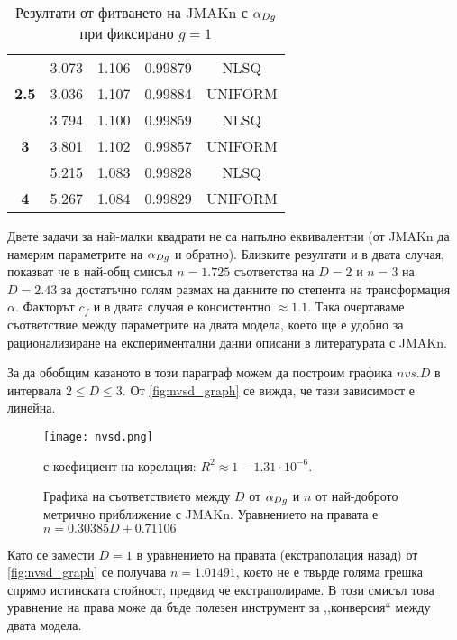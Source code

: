 \begin{table}[hbtp]
{\begin{tabular}{@{}ccccc@{}}
                                 & 3.073                         & 1.106                          & 0.99879                            & NLSQ                            \\
\multirow{-2}{*}{\textbf{2.5}}   & \cellcolor[HTML]{EFEFEF}3.036 & \cellcolor[HTML]{EFEFEF}1.107  & \cellcolor[HTML]{EFEFEF}0.99884    & \cellcolor[HTML]{EFEFEF}UNIFORM \\ \midrule
                                 & 3.794                         & 1.100                          & 0.99859                            & NLSQ                            \\
\multirow{-2}{*}{\textbf{3}}     & \cellcolor[HTML]{EFEFEF}3.801 & \cellcolor[HTML]{EFEFEF}1.102  & \cellcolor[HTML]{EFEFEF}0.99857    & \cellcolor[HTML]{EFEFEF}UNIFORM \\
                                 & 5.215                         & 1.083                          & 0.99828                            & NLSQ                            \\
\multirow{-2}{*}{\textbf{4}}     & \cellcolor[HTML]{EFEFEF}5.267 & \cellcolor[HTML]{EFEFEF}1.084  & \cellcolor[HTML]{EFEFEF}0.99829    & \cellcolor[HTML]{EFEFEF}UNIFORM \\ \bottomrule
\end{tabular}%
}
\caption{Резултати от фитването на JMAKn с $\alpha_{Dg}$ при фиксирано $g = 1$}
\label{tabl:fit_jmak_with_adg}
\end{table}

Двете задачи за най-малки квадрати не са напълно еквивалентни (от JMAKn да намерим параметрите на $\alpha_{Dg}$ и обратно). Близките резултати и в двата случая, показват че в най-общ смисъл $n = 1.725$ съответства на $D = 2$ и $n = 3$ на $D = 2.43$ за достатъчно голям размах на данните по степента на трансформация $\alpha$. Факторът $c_{f}$ и в двата случая е консистентно $\approx 1.1$. Така очертаваме съответствие между параметрите на двата модела, което ще е удобно за рационализиране на експериментални данни описани в литературата с JMAKn. 

За да обобщим казаното в този параграф можем да построим графика $n vs. D$ в интервала $2 \le D \le 3$. От \autoref{fig:nvsd_graph} се вижда, че тази зависимост е линейна. 
\begin{figure}[hbpt]
    \centering
    \texttt{[image: nvsd.png]}
    \caption{Графика на съответствието между $D$ от $\alpha_{Dg}$ и $n$ от най-доброто метрично приближение с JMAKn. Уравнението на правата е $n  = 0.30385 D + 0.71106$} с коефициент на корелация: $R^2 \approx 1 - 1.31 \cdot 10^{-6}$.
    \label{fig:nvsd_graph}
\end{figure}
Като се замести $D = 1$ в уравнението на правата (екстраполация назад) от \autoref{fig:nvsd_graph} се получава $n = 1.01491$, което не е твърде голяма грешка спрямо истинската стойност, предвид че екстраполираме. В този смисъл това уравнение на права може да бъде полезен инструмент за ,,конверсия`` между двата модела.
